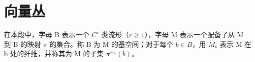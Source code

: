 \section{向量丛}

在本段中，字母 B 表示一个 \(C^{r}\) 类流形（\(r \geqslant 1\)），字母 M 表示一个配备了从 M 到 B 的映射 \(\pi\) 的集合。称 B 为 M 的基空间；对于每个 \(b \in B\)，用 \(M_{b}\) 表示 M 在 b 处的纤维，并称其为 M 的子集 \(\pi^{-1}(b)\)。
\relax{}

